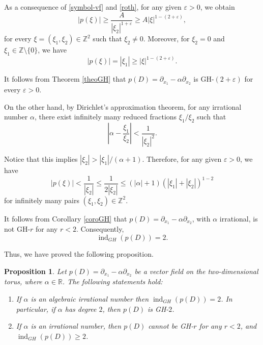 \documentclass[11pt]{amsart}
\numberwithin{equation}{section}
\newtheorem{proposition}[theorem]{Proposition}
\theoremstyle{definition}
\begin{document}
	As a consequence of \eqref{symbol-vf} and \eqref{roth}, for any given \( \varepsilon > 0 \), we obtain
	\begin{equation*}
		|p(\xi)| \geq \frac{A}{|\xi_2|^{1+\varepsilon}} \geq A |\xi|^{1-(2+\varepsilon)},
	\end{equation*}
	for every \( \xi = (\xi_1, \xi_2) \in \mathbb{Z}^2 \) such that \( \xi_2 \neq 0 \). Moreover, for \( \xi_2 = 0 \) and \( \xi_1 \in \mathbb{Z} \setminus \{0\} \), we have
	\begin{equation*}
		|p(\xi)| = |\xi_1| \geq |\xi|^{1-(2+\varepsilon)}.
	\end{equation*}
	
	It follows from Theorem \ref{theoGH} that \( p(D) = \partial_{x_1} - \alpha \partial_{x_2} \) is GH-\((2+\varepsilon)\) for every \( \varepsilon > 0 \).
	
	On the other hand, by Dirichlet's approximation theorem, for any irrational number \( \alpha \), there exist infinitely many reduced fractions \( \xi_1 / \xi_2 \) such that
	\begin{equation}\label{rothpat2}
		\left| \alpha - \frac{\xi_1}{\xi_2} \right| < \frac{1}{|\xi_2|^2}.
	\end{equation}
	
	Notice that this implies \( |\xi_2| > |\xi_1|/(\alpha+1) \). Therefore, for any given \( \varepsilon > 0 \), we have
	\begin{equation*}
		|p(\xi)| < \frac{1}{|\xi_2|} \leq \frac{1}{2|\xi_2|} \leq (|\alpha| + 1)(|\xi_1| + |\xi_2|)^{1-2}
	\end{equation*}
	for infinitely many pairs \( (\xi_1, \xi_2) \in \mathbb{Z}^2 \).
	
	It follows from Corollary \ref{coroGH} that \( p(D) = \partial_{x_1} - \alpha \partial_{x_2} \), with \( \alpha \) irrational, is not GH-\( r \) for any \( r < 2 \). Consequently,
	\[
	\operatorname{ind}_{GH}(p(D)) = 2.
	\]
	
	Thus, we have proved the following proposition.
	
	\begin{proposition}\label{Thm2-GHr-vf-T2}
		Let \( p(D) = \partial_{x_1} - \alpha \partial_{x_2} \) be a vector field on the two-dimensional torus, where \( \alpha \in \mathbb{R} \). The following statements hold:
		\begin{enumerate}
			\item[{\it (i)}] If \( \alpha \) is an algebraic irrational number then 
			\( \operatorname{ind}_{GH}(p(D)) = 2 \). 
            In particular, if $\alpha$ has degree \( 2 \), then \( p(D) \) is GH-\( 2 \).
			\item[{\it (ii)}] If \( \alpha \) is an irrational number, then \( p(D) \) cannot be GH-\( r \) for any \( r < 2 \), and $\operatorname{ind}_{GH}(p(D))\geq 2$.
		\end{enumerate}
	\end{proposition}
        
\end{document}
